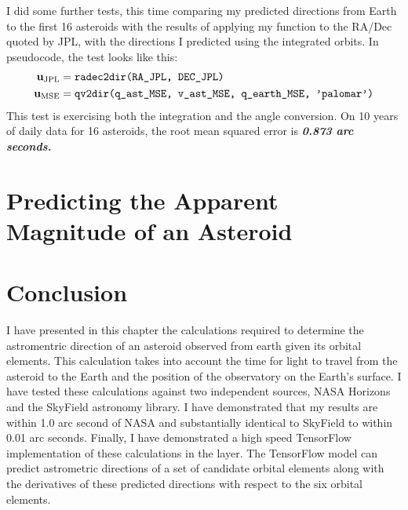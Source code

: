 I did some further tests, this time comparing my predicted directions from Earth to the first 16 asteroids 
with the results of applying my  function to the RA/Dec quoted by JPL,
with the directions I predicted using the integrated orbits.  In pseudocode, the test looks like this:
\begin{align*}
\mathbf{u}_{\mathrm{JPL}} &= \texttt{radec2dir(RA\_JPL, DEC\_JPL)} \\
\mathbf{u}_{\mathrm{MSE}} &= \texttt{qv2dir(q\_ast\_MSE, v\_ast\_MSE, q\_earth\_MSE, 'palomar')}
\end{align*}
This test is exercising both the integration and the angle conversion.
On 10 years of daily data for 16 asteroids, the root mean squared error is \textbf{\emph{0.873 arc seconds.}}

\section{Predicting the Apparent Magnitude of an Asteroid}
\label{section_mag}

\section{Conclusion}
\label{section_conclusion}
I have presented in this chapter the calculations required to determine the astromentric direction 
of an asteroid observed from earth given its orbital elements.
This calculation takes into account the time for light to travel from the asteroid to the Earth
and the position of the observatory on the Earth's surface.
I have tested these calculations against two independent sources, NASA Horizons and the SkyField astronomy library.
I have demonstrated that my results are within 1.0 arc second of NASA and substantially identical to SkyField to within 0.01 arc seconds.
Finally, I have demonstrated a high speed TensorFlow implementation of these calculations in the  layer.
The TensorFlow model can predict astrometric directions of a set of candidate orbital elements 
along with the derivatives of these predicted directions with respect to the six orbital elements.
